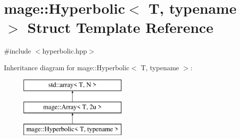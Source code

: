 \hypertarget{structmage_1_1_hyperbolic}{}\section{mage\+:\+:Hyperbolic$<$ T, typename $>$ Struct Template Reference}
\label{structmage_1_1_hyperbolic}


{\ttfamily \#include $<$hyperbolic.\+hpp$>$}

Inheritance diagram for mage\+:\+:Hyperbolic$<$ T, typename $>$\+:\begin{figure}[H]
\begin{center}
\leavevmode
\includegraphics[height=3.000000cm]{structmage_1_1_hyperbolic}
\end{center}
\end{figure}
